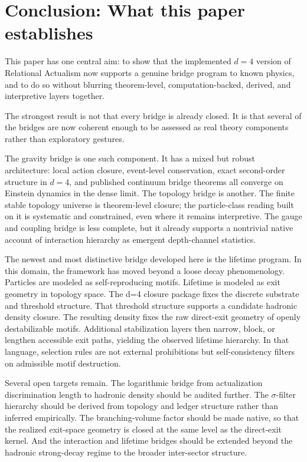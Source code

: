 \documentclass[11pt]{article}
\begin{document}
\section{Conclusion: What this paper establishes}\label{sec:conclusion}
This paper has one central aim: to show that the implemented $d=4$ version of Relational Actualism now supports a genuine bridge program to known physics, and to do so without blurring theorem-level, computation-backed, derived, and interpretive layers together.

The strongest result is not that every bridge is already closed. It is that several of the bridges are now coherent enough to be assessed as real theory components rather than exploratory gestures.

The gravity bridge is one such component. It has a mixed but robust architecture: local action closure, event-level conservation, exact second-order structure in $d=4$, and published continuum bridge theorems all converge on Einstein dynamics in the dense limit. The topology bridge is another. The finite stable topology universe is theorem-level closure; the particle-class reading built on it is systematic and constrained, even where it remains interpretive. The gauge and coupling bridge is less complete, but it already supports a nontrivial native account of interaction hierarchy as emergent depth-channel statistics.

The newest and most distinctive bridge developed here is the lifetime program. In this domain, the framework has moved beyond a loose decay phenomenology. Particles are modeled as self-reproducing motifs. Lifetime is modeled as exit geometry in topology space. The d=4 closure package fixes the discrete substrate and threshold structure. That threshold structure supports a candidate hadronic density closure. The resulting density fixes the raw direct-exit geometry of openly destabilizable motifs. Additional stabilization layers then narrow, block, or lengthen accessible exit paths, yielding the observed lifetime hierarchy. In that language, selection rules are not external prohibitions but self-consistency filters on admissible motif destruction.

Several open targets remain. The logarithmic bridge from actualization discrimination length to hadronic density should be audited further. The $\sigma$-filter hierarchy should be derived from topology and ledger structure rather than inferred empirically. The branching-volume factor should be made native, so that the realized exit-space geometry is closed at the same level as the direct-exit kernel. And the interaction and lifetime bridges should be extended beyond the hadronic strong-decay regime to the broader inter-sector structure.
\end{document}
